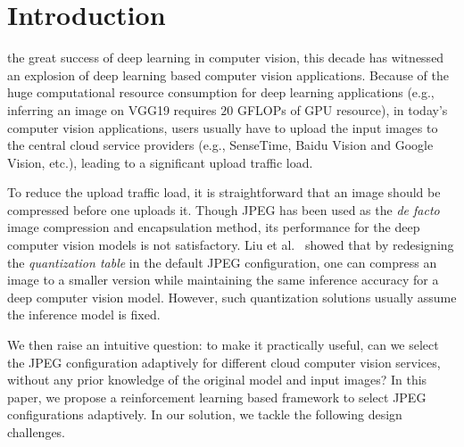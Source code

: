\section{Introduction}
\label{sec: introduction}

 the great success of deep learning in computer vision, this decade has witnessed an explosion of deep learning based computer vision applications. Because of the huge computational resource consumption for deep learning applications (e.g., inferring an image on VGG19 \cite{VGG19} requires $20$ GFLOPs of GPU resource), in today's computer vision applications, users usually have to upload the input images to the central cloud service providers (e.g., SenseTime, Baidu Vision and Google Vision, etc.), leading to a significant upload traffic load. 

To reduce the upload traffic load, it is straightforward that an image should be compressed before one uploads it. Though JPEG has been used as the {\em de facto} image compression and encapsulation method, its performance for the deep computer vision models is not satisfactory. Liu et al.~\cite{DeepN-JPEG} showed that by redesigning the \emph{quantization table} in the default JPEG configuration, one can compress an image to a smaller version while maintaining the same inference accuracy for a deep computer vision model. However, such quantization solutions usually assume the inference model is fixed. 

We then raise an intuitive question: to make it practically useful, can we select the JPEG configuration adaptively for different cloud computer vision services, without any prior knowledge of the original model and input images? In this paper, we propose a reinforcement learning based framework to select JPEG configurations adaptively. In our solution, we tackle the following design challenges.

